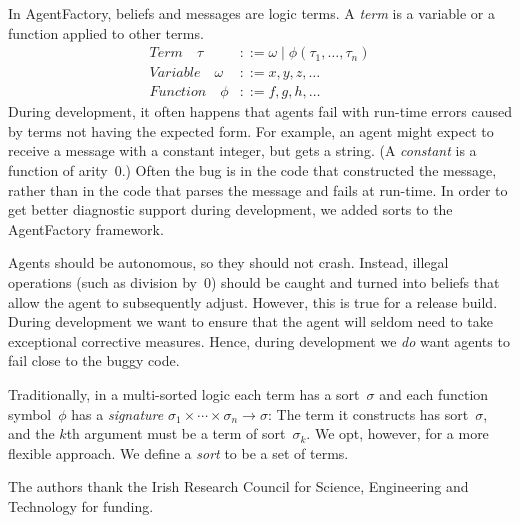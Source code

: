 \documentclass[preprint]{sigplanconf} %
\begin{document}
In AgentFactory, beliefs and messages are logic terms. A \emph{term} is a
variable or a function applied to other terms.
\begin{align}
\mathit{Term}\quad\tau
  &::= \omega
  \mid \phi(\tau_1,\ldots,\tau_n) \\
\mathit{Variable}\quad\omega
  &::= x, y, z, \ldots \\
\mathit{Function}\quad\phi
  &::= f, g, h, \ldots
\end{align}
During development, it often happens that agents fail with run-time errors
caused by terms not having the expected form. For example, an agent might
expect to receive a message with a constant integer, but gets a string.  (A
\emph{constant} is a function of arity~$0$.) Often the bug is in the code
that constructed the message, rather than in the code that parses the
message and fails at run-time. In order to get better diagnostic support
during development, we added sorts to the AgentFactory framework.

Agents should be autonomous, so they should not crash. Instead, illegal
operations (such as division by~$0$) should be caught and turned into
beliefs that allow the agent to subsequently adjust. However, this is true
for a release build. During development we want to ensure that the agent
will seldom need to take exceptional corrective measures. Hence, during
development we \emph{do} want agents to fail close to the buggy code.

Traditionally, in a multi-sorted logic each term has a sort~$\sigma$ and
each function symbol~$\phi$ has a \emph{signature}
$\sigma_1\times\cdots\times\sigma_n\to\sigma$: The term it constructs has
sort~$\sigma$, and the $k$th argument must be a term of sort~$\sigma_k$. We
opt, however, for a more flexible approach. We define a \emph{sort} to be a
set of terms.

\acks

The authors thank the Irish Research Council for Science, Engineering and
Technology for funding.




\end{document}
